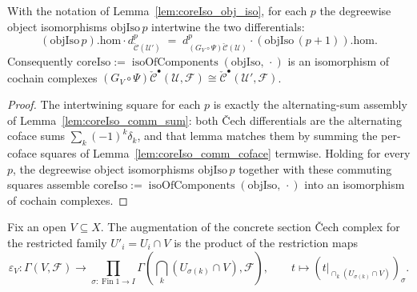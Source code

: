 \begin{lemma}\leanok
  \label{lem:coreIso_comm}
  With the notation of Lemma~\ref{lem:coreIso_obj_iso}, for each \(p\) the degreewise object
  isomorphisms \(\mathrm{objIso}\,p\) intertwine the two differentials:
  \[
    (\mathrm{objIso}\,p).\mathrm{hom} \cdot
      d^{p}_{\check{\mathcal{C}}(\mathcal{U}')}
      \;=\;
    d^{p}_{(G_V\circ\Psi)\check{\mathcal{C}}(\mathcal{U})} \cdot
      (\mathrm{objIso}\,(p+1)).\mathrm{hom}.
  \]
  Consequently \(\mathrm{coreIso} := \operatorname{isoOfComponents}(\mathrm{objIso},\,\cdot)\)
  is an isomorphism of cochain complexes \((G_V\circ\Psi)\check{\mathcal{C}}^\bullet(\mathcal{U},
  \mathcal{F}) \cong \check{\mathcal{C}}^\bullet(\mathcal{U}', \mathcal{F})\).
\end{lemma}
\begin{proof}
  \leanok
  The intertwining square for each \(p\) is exactly the alternating-sum assembly of
  Lemma~\ref{lem:coreIso_comm_sum}: both {\v C}ech differentials are the alternating coface sums
  \(\sum_k (-1)^k \delta_k\), and that lemma matches them by summing the per-coface squares of
  Lemma~\ref{lem:coreIso_comm_coface} termwise. Holding for every \(p\), the degreewise object
  isomorphisms \(\mathrm{objIso}\,p\) together with these commuting squares assemble
  \(\mathrm{coreIso} := \operatorname{isoOfComponents}(\mathrm{objIso},\,\cdot)\) into an
  isomorphism of cochain complexes.

\end{proof}

\begin{definition}\leanok
  \label{def:sectionCechAugV}
  Fix an open \(V \subseteq X\). The augmentation of the concrete section {\v C}ech complex for
  the restricted family \(U'_i=U_i\cap V\) is the product of the restriction maps
  \[
    \varepsilon_V : \Gamma(V, \mathcal{F}) \longrightarrow
      \prod_{\sigma:\operatorname{Fin}1\to I}
        \Gamma\!\left(\bigcap_k(U_{\sigma(k)}\cap V),\mathcal{F}\right),
    \qquad
    t\longmapsto
      \left(t\big|_{\cap_k(U_{\sigma(k)}\cap V)}\right)_{\sigma}.
  \]
\end{definition}

